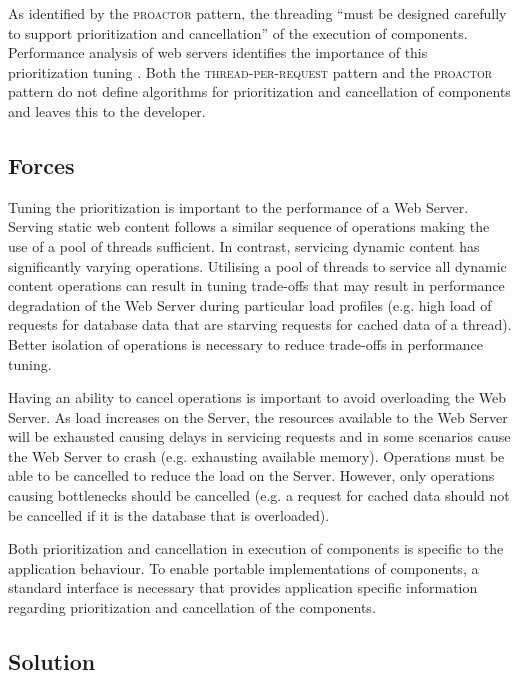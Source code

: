 \documentclass[prodmode]{style/acmlarge}
\begin{document}
As identified by the \textsc{proactor} pattern, the threading ``must be designed
carefully to support prioritization and cancellation'' \cite[p. 8]{proactor} of
the execution of components.  Performance analysis of web servers identifies the
importance of this prioritization tuning
\cite{tuning-important,low-server-footprint,tuning-os-important}.  Both the
\textsc{thread-per-request} pattern and the \textsc{proactor} pattern do not
define algorithms for prioritization and cancellation of components and leaves
this to the developer.


\subsection{Forces}

Tuning the prioritization is important to the performance of a Web Server.
Serving static web content follows a similar sequence of operations making the
use of a pool of threads sufficient.  In contrast, servicing dynamic content has
significantly varying operations.  Utilising a pool of threads to service all
dynamic content operations can result in tuning trade-offs that may result in
performance degradation of the Web Server during particular load profiles (e.g.
high load of requests for database data that are starving requests for cached
data of a thread).  Better isolation of operations is necessary to reduce
trade-offs in performance tuning.

Having an ability to cancel operations is important to avoid overloading the Web
Server.  As load increases on the Server, the resources available to the Web
Server will be exhausted causing delays in servicing requests and in some
scenarios cause the Web Server to crash (e.g. exhausting available memory). 
Operations must be able to be cancelled to reduce the load on the Server. 
However, only operations causing bottlenecks should be cancelled (e.g. a request
for cached data should not be cancelled if it is the database that is
overloaded).

Both prioritization and cancellation in execution of components is specific to
the application behaviour.  To enable portable implementations of components, a
standard interface is necessary that provides application specific information
regarding prioritization and cancellation of the components.


\subsection{Solution}
\end{document}
